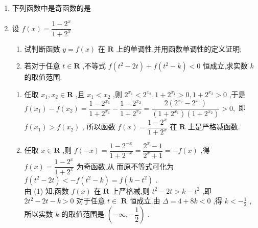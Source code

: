\begin{enumerate}
    \item 下列函数中是奇函数的是
    \item 设 $f\left( x\right)  = \dfrac{1 - {2}^{x}}{1 + {2}^{x}}$
    \begin{enumerate}
        \item 试判断函数 $y = f\left( x\right)$ 在 $\mathbf{R}$ 上的单调性,并用函数单调性的定义证明;
        \item 若对于任意 $t \in  \mathbf{R}$ ,不等式 $f\left( {{t}^{2} - {2t}}\right)  + f\left( {{t}^{2} - k}\right)  < 0$ 恒成立,求实数 $k$ 的取值范围.
        \end{enumerate}
        \begin{jieda}
            \begin{enumerate}
                \item 任取 ${x}_{1},{x}_{2} \in  \mathbf{R}$ ,且 ${x}_{1} < {x}_{2}$ ,则 ${2}^{{x}_{1}} < {2}^{{x}_{2}},1 + {2}^{{x}_{1}} > 0,1 + {2}^{{x}_{2}} > 0$ ,于是
                $f\left( {x}_{1}\right)  - f\left( {x}_{2}\right)  = \dfrac{1 - {2}^{{x}_{1}}}{1 + {2}^{{x}_{1}}} - \dfrac{1 - {2}^{{x}_{2}}}{1 + {2}^{{x}_{2}}} = \dfrac{2\left( {{2}^{{x}_{2}} - {2}^{{x}_{1}}}\right) }{\left( {1 + {2}^{{x}_{1}}}\right) \left( {1 + {2}^{{x}_{2}}}\right) } > 0,$
                即 $f\left( {x}_{1}\right)  > f\left( {x}_{2}\right)$ , 所以函数 $f\left( x\right)  = \dfrac{1 - {2}^{x}}{1 + {2}^{x}}$ 在 $\mathbf{R}$ 上是严格减函数.
                \item 任取 $x \in  \mathbf{R}$ ,则 $f\left( {-x}\right)  = \dfrac{1 - {2}^{-x}}{1 + {2}^{-x}} = \dfrac{{2}^{x} - 1}{{2}^{x} + 1} =  - f\left( x\right)$ ,得 $f\left( x\right)  = \dfrac{1 - {2}^{x}}{1 + {2}^{x}}$ 为奇函数,从
                而原不等式可化为 $f\left( {{t}^{2} - {2t}}\right)  <  - f\left( {{t}^{2} - k}\right)  = f\left( {k - {t}^{2}}\right)$ . \\
                由 (1) 知,函数 $f\left( x\right)$ 在 $\mathbf{R}$ 上严格减,则 ${t}^{2} - {2t} > k - {t}^{2}$ ,即 $2{t}^{2} - {2t} - k > 0$ 对于任意 $t \in$
                $\mathbf{R}$ 恒成立,由 $\Delta  = 4 + {8k} < 0$ ,得 $k <  - \frac{1}{2}$ ,所以实数 $k$ 的取值范围是 $\left( {-\infty , - \dfrac{1}{2}}\right)$ .

\end{enumerate}
\end{jieda}
\end{enumerate}
